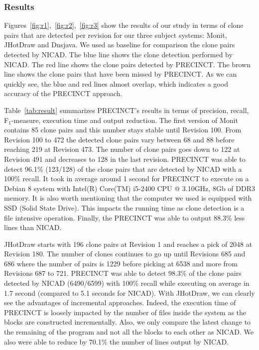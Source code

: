 

\subsubsection{Results}
\label{sub:Results}

Figures~\ref{fig:r1},~\ref{fig:r2},~\ref{fig:r3} show the results of our study in terms of clone pairs that are detected per revision for our three subject systems: Monit, JHotDraw and Dnsjava. We used as baseline for comparison the clone pairs detected by NICAD. The blue line shows the clone detection performed by NICAD. The red line shows the clone pairs detected by PRECINCT. The brown line shows the clone pairs that have been missed by PRECINCT. As we can quickly see, the blue and red lines almost overlap, which indicates a good accuracy of the PRECINCT approach.



Table~\ref{tab:result} summarizes PRECINCT's results in terms of precision, recall, F$_{1}$-measure, execution time and output reduction.
The first version of Monit contains 85 clone pairs and this number stays stable until Revision 100. From Revision 100 to 472 the detected clone pairs vary between 68 and 88 before reaching 219 at Revision 473.
The number of clone pairs goes down to 122 at Revision 491 and decreases to 128 in the last revision. PRECINCT was able to detect 96.1\% (123/128) of the clone pairs that are detected by NICAD with a 100\% recall.
It took in average around 1 second for PRECINCT to execute on a Debian 8 system with Intel(R) Core(TM) i5-2400 CPU @ 3.10GHz, 8Gb of DDR3 memory.
It is also worth mentioning that the computer we used is equipped with SSD (Solid State Drive).
This impacts the running time as clone detection is a file intensive operation.
Finally, the PRECINCT was able to output 88.3\% less lines than NICAD.

JHotDraw starts with 196 clone pairs at Revision 1 and reaches a pick of 2048 at Revision 180. The number of clones  continues to go up until Revisions 685 and 686 where the number of pairs is 1229 before picking at 6538 and more from Revisions 687 to 721.
PRECINCT was able to detect 98.3\% of the clone pairs detected by NICAD (6490/6599) with 100\% recall while executing on average in 1.7 second (compared to 5.1 seconds for NICAD).
With JHotDraw, we can clearly see the advantages of incremental approaches.
Indeed, the execution time of PRECINCT is loosely impacted by the number of files inside the system as the blocks are constructed incrementally.
Also, we only compare the latest change to the remaining of the program and not all the blocks to each other as NICAD.
We also were able to reduce by 70.1\% the number of lines output by NICAD.

